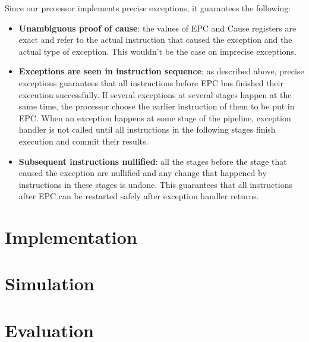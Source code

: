\documentclass[oneside]{book}
\begin{document}
Since our prcoessor implements precise exceptions, it guarantees
the following:

\begin{itemize}

\item \textbf{Unambiguous proof of cause}: the values of EPC and
      Cause registers are exact and refer to the actual instruction
      that caused the exception and the actual type of exception.
      This wouldn't be the case on imprecise exceptions.

\item \textbf{Exceptions are seen in instruction sequence}:
       as described above, precise exceptions guarantees that
       all instructions before EPC has finished their execution
       successfully. If several exceptions at several stages happen
       at the same time, the processor choose the earlier instruction
       of them to be put in EPC. When an exception happens
       at some stage of the pipeline, exception handler is not
       called until all instructions in the following stages finish
       execution and commit their results.

\item \textbf{Subsequent instructions nullified}:
      all the stages before the stage that caused the exception
      are nullified and any change that happened by instructions
      in these stages is undone. This guarantees that all instructions
      after EPC can be restarted safely after exception handler returns.

\end{itemize}


\chapter{Implementation}


\chapter{Simulation}


\chapter{Evaluation}
\end{document}
